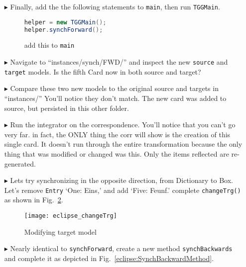 \begin{itemize}
\item[$\blacktriangleright$] Finally, add the the following statements to \texttt{main}, then run \texttt{TGGMain}.

\begin{figure}[htbp]
\begin{center}
\begin{lstlisting}[language=Java,backgroundcolor=\color{white}, keywordstyle={\bfseries\color{purple}}]
helper = new TGGMain();
helper.synchForward();
\end{lstlisting}
\caption{add this to \texttt{main}}
  \label{code:synchForward}
\end{center}
\end{figure}

\item[$\blacktriangleright$] Navigate to ``instances/synch/FWD/'' and inspect the new \texttt{source} and \texttt{target} models. 
Is the fifth Card now in both source and target?

\item[$\blacktriangleright$] Compare these two new models to the original source and targets in ``instances/'' You'll notice they don't match. The new card was
added to source, but persisted in this other folder. 

\item[$\blacktriangleright$] Run the integrator on the correspondence. You'll notice that you can't go very far. in fact, the ONLY thing the corr will
show is the creation of this single card. It doesn't run through the entire transformation because the only thing that was modified or changed was this. Only
the items reflected are re-generated.

\item[$\blacktriangleright$] Lets try synchronizing in the opposite direction, from Dictionary to Box. Let's remove \texttt{Entry} `One: Eins,' and add `Five:
Feunf.' complete \texttt{changeTrg()} as shown in Fig.~\ref{eclipse:changeTrg}.

\begin{figure}[htbp]
\begin{center}
  \texttt{[image: eclipse\_changeTrg]}
  \caption{Modifying target model}
  \label{eclipse:changeTrg}
\end{center}
\end{figure}

\item[$\blacktriangleright$] Nearly identical to \texttt{synchForward}, create a new method \texttt{synchBackwards} and complete it as depicted in
Fig.~\ref{eclipse:SynchBackwardMethod}.


\end{itemize}
